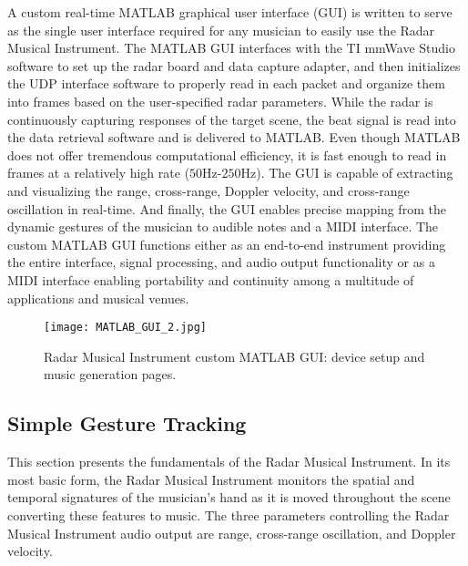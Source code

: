 \documentclass[10pt,journal,final]{IEEEtran}
\begin{document}
A custom real-time MATLAB graphical user interface (GUI) is written to serve as the single user interface required for any musician to easily use the Radar Musical Instrument. The MATLAB GUI interfaces with the TI mmWave Studio software \cite{TI:mmWave_Studio} to set up the radar board and data capture adapter, and then initializes the UDP interface software to properly read in each packet and organize them into frames based on the user-specified radar parameters. While the radar is continuously capturing responses of the target scene, the beat signal is read into the data retrieval software and is delivered to MATLAB. Even though MATLAB does not offer tremendous computational efficiency, it is fast enough to read in frames at a relatively high rate ($50$Hz-$250$Hz). The GUI is capable of extracting and visualizing the range, cross-range, Doppler velocity, and cross-range oscillation in real-time. And finally, the GUI enables precise mapping from the dynamic gestures of the musician to audible notes and a MIDI interface. The custom MATLAB GUI functions either as an end-to-end instrument providing the entire interface, signal processing, and audio output functionality or as a MIDI interface enabling portability and continuity among a multitude of applications and musical venues.

\begin{figure}[h]
	\centering
	\texttt{[image: MATLAB\_GUI\_2.jpg]}
	\caption{Radar Musical Instrument custom MATLAB GUI: device setup and music generation pages.}
	\label{fig:matlab_gui}
\end{figure}

\subsection{Simple Gesture Tracking}
\label{subsec:classical_gesture_tracking}
This section presents the fundamentals of the Radar Musical Instrument. In its most basic form, the Radar Musical Instrument monitors the spatial and temporal signatures of the musician's hand as it is moved throughout the scene converting these features to music. The three parameters controlling the Radar Musical Instrument audio output are range, cross-range oscillation, and Doppler velocity.
\end{document}
